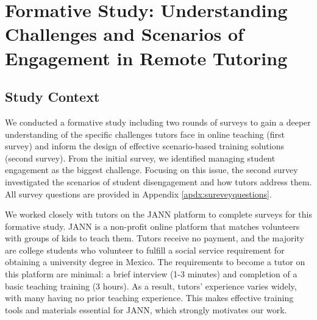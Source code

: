 \section{Formative Study: Understanding Challenges and Scenarios of Engagement in Remote Tutoring}
\label{sec:formative_study}

\subsection{Study Context}

We conducted a formative study including two rounds of surveys to gain a deeper understanding of the specific challenges tutors face in online teaching (first survey) and inform the design of effective scenario-based training
solutions (second survey). From the initial survey, we identified managing student engagement as the biggest challenge. Focusing on this issue, the second survey investigated the scenarios of student disengagement and how tutors address them. All survey questions are provided in Appendix \ref{apdx:sureveyquestions}. 

We worked closely with tutors on the JANN platform to complete surveys for this formative study. JANN is a non-profit online platform that matches volunteers with groups of kids to teach them. Tutors receive no payment, and the majority are college students who volunteer to fulfill a social service requirement for obtaining a university degree in Mexico. The requirements to become a tutor on this platform are minimal: a brief interview (1-3 minutes) and completion of a basic teaching training (3 hours). As a result, tutors' experience varies widely, with many having no prior teaching experience. This makes effective training tools and materials essential for JANN, which strongly motivates our work.


